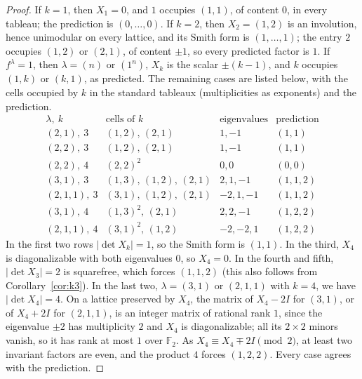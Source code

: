 \documentclass[11pt]{article}
\theoremstyle{remark}
\newcommand{\F}{\mathbb{F}}
\begin{document}
\begin{appendices}
\begin{proof}
If $k=1$, then $X_1=0$, and $1$ occupies $(1,1)$, of content $0$, in every
tableau; the prediction is $(0,\dots,0)$. If $k=2$, then $X_2=(1,2)$ is an
involution, hence unimodular on every lattice, and its Smith form is
$(1,\dots,1)$; the entry $2$ occupies $(1,2)$ or $(2,1)$, of content $\pm1$, so
every predicted factor is $1$. If $f^\lambda=1$, then $\lambda=(n)$ or
$(1^n)$, $X_k$ is the scalar $\pm(k-1)$, and $k$ occupies $(1,k)$ or $(k,1)$,
as predicted. The remaining cases are listed below, with the cells occupied
by $k$ in the standard tableaux (multiplicities as exponents) and the
prediction.
\[
\begin{array}{llll}
\lambda,\ k & \text{cells of }k & \text{eigenvalues} & \text{prediction}\\\hline
(2,1),\ 3 & (1,2),\,(2,1) & 1,-1 & (1,1)\\
(2,2),\ 3 & (1,2),\,(2,1) & 1,-1 & (1,1)\\
(2,2),\ 4 & (2,2)^2 & 0,0 & (0,0)\\
(3,1),\ 3 & (1,3),\,(1,2),\,(2,1) & 2,1,-1 & (1,1,2)\\
(2,1,1),\ 3 & (3,1),\,(1,2),\,(2,1) & -2,1,-1 & (1,1,2)\\
(3,1),\ 4 & (1,3)^2,\,(2,1) & 2,2,-1 & (1,2,2)\\
(2,1,1),\ 4 & (3,1)^2,\,(1,2) & -2,-2,1 & (1,2,2)
\end{array}
\]
In the first two rows $|\det X_k|=1$, so the Smith form is $(1,1)$. In the
third, $X_4$ is diagonalizable with both eigenvalues $0$, so $X_4=0$. In the
fourth and fifth, $|\det X_3|=2$ is squarefree, which forces $(1,1,2)$ (this
also follows from Corollary~\ref{cor:k3}). In the last two, $\lambda=(3,1)$ or
$(2,1,1)$ with $k=4$, we have $|\det X_4|=4$. On a lattice preserved by $X_4$,
the matrix of $X_4-2I$ for $(3,1)$, or of $X_4+2I$ for $(2,1,1)$, is an
integer matrix of rational rank $1$, since the eigenvalue $\pm2$ has
multiplicity $2$ and $X_4$ is diagonalizable; all its $2\times2$ minors
vanish, so it has rank at most $1$ over $\F_2$. As
$X_4\equiv X_4\mp2I\pmod 2$, at least two invariant factors are even, and the
product $4$ forces $(1,2,2)$. Every case agrees with the prediction.
\end{proof}


\end{appendices}
\end{document}
